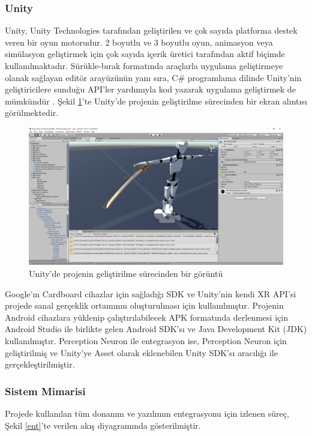 \documentclass[a4paper, 12pt, titlepage]{article}
\begin{document}
\subsubsection{Unity}
Unity, Unity Technologies tarafından geliştirilen ve çok sayıda platforma destek veren bir oyun
motorudur. 2 boyutlu ve 3 boyutlu oyun, animasyon veya simülasyon geliştirmek için çok sayıda
içerik üretici tarafından aktif biçimde kullanılmaktadır. Sürükle-bırak formatında araçlarla
uygulama geliştirmeye olanak sağlayan editör arayüzünün yanı sıra, C\# programlama dilinde
Unity’nin geliştiricilere sunduğu API’ler yardımıyla kod yazarak uygulama geliştirmek de mümkündür \cite{unityg}.
Şekil \ref{u}'te Unity’de projenin geliştirilme sürecinden bir ekran alıntısı
görülmektedir.

\begin{figure}[ht!]
    \centering
        \includegraphics[width=5.8in]{images/u2}
    \caption{Unity'de projenin geliştirilme sürecinden bir görüntü}   
    \label{u}
\end{figure}

Google’ın Cardboard cihazlar için sağladığı SDK ve Unity’nin kendi XR API’si projede sanal
gerçeklik ortamının oluşturulması için kullanılmıştır. Projenin Android cihazlara yüklenip
çalıştırılabilecek APK formatında derlenmesi için Android Studio ile birlikte gelen Android SDK’sı
ve Java Development Kit (JDK) kullanılmıştır. Perception Neuron ile entegrasyon ise, Perception
Neuron için geliştirilmiş ve Unity’ye Asset olarak eklenebilen Unity SDK’sı aracılığı ile
gerçekleştirilmiştir.

\subsubsection{Sistem Mimarisi}
Projede kullanılan tüm donanım ve yazılımın entegrasyonu için izlenen süreç, Şekil \ref{ent}’te
verilen akış diyagramında gösterilmiştir.
\end{document}
